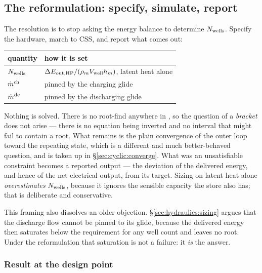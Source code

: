 \subsection{The reformulation: specify, simulate, report}
\label{sec:cyclic:reform}

The resolution is to stop asking the energy balance to determine $N_{\mathrm{wells}}$.
Specify the hardware, march to CSS, and report what comes out:

\begin{center}
\begin{tabular}{@{}l l@{}}
\toprule
quantity & how it is set \\
\midrule
$N_{\mathrm{wells}}$ & $\Delta E_{\mathrm{out,HP}}/(\rho_{m} V_{\mathrm{well}}h_{m})$, latent heat alone \\
$\dot m^{\mathrm{ch}}$ & pinned by the charging glide \\
$\dot m^{\mathrm{dc}}$ & pinned by the discharging glide \\
\bottomrule
\end{tabular}
\end{center}

\noindent
Nothing is solved. There is no root-find anywhere in , so
the question of a \emph{bracket} does not arise --- there is no equation being
inverted and no interval that might fail to contain a root. What remains is the
plain convergence of the outer loop toward the repeating state, which is a
different and much better-behaved question, and is taken up in
\S\ref{sec:cyclic:converge}. What was an unsatisfiable constraint becomes a
reported output --- the deviation of the delivered energy, and hence of the net
electrical output, from its target. Sizing on latent heat alone
\emph{overestimates} $N_{\mathrm{wells}}$, because it ignores the sensible capacity the
store also has; that is deliberate and conservative.

This framing also dissolves an older objection. \S\ref{sec:hydraulics:sizing}
argues that the discharge flow cannot be pinned to its glide, because the
delivered energy then saturates below the requirement for any well count and
leaves no root. Under the reformulation that saturation is not a failure: it
\emph{is} the answer.

\subsubsection*{Result at the design point}

